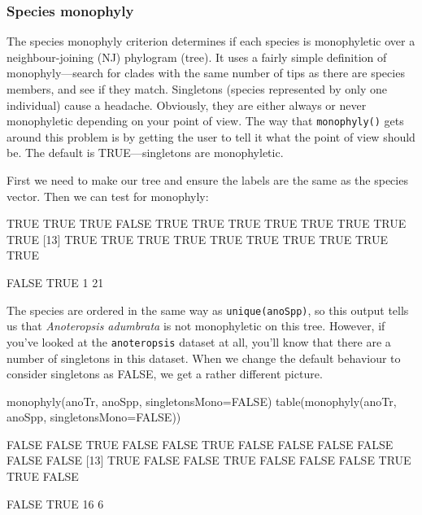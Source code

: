 \documentclass{article}
\newcommand{\scinm}{\emph}
\newcommand{\fun}[1]{\texttt{#1}}
\begin{document}
\subsubsection{Species monophyly}

The species monophyly criterion determines if each species is monophyletic over a neighbour-joining (NJ) phylogram (tree). It uses a fairly simple definition of monophyly---search for clades with the same number of tips as there are species members, and see if they match. Singletons (species represented by only one individual) cause a headache. Obviously, they are either always or never monophyletic depending on your point of view. The way that \fun{monophyly()} gets around this problem is by getting the user to tell it what the point of view should be. The default is TRUE---singletons are monophyletic.

First we need to make our tree and ensure the labels are the same as the species vector. Then we can test for monophyly:


\begin{Routput}
 [1]  TRUE  TRUE  TRUE FALSE  TRUE  TRUE  TRUE  TRUE  TRUE  TRUE  TRUE  TRUE
[13]  TRUE  TRUE  TRUE  TRUE  TRUE  TRUE  TRUE  TRUE  TRUE  TRUE

FALSE  TRUE 
    1    21
\end{Routput}

The species are ordered in the same way as \fun{unique(anoSpp)}, so this output tells us that \scinm{Anoteropsis adumbrata} is not monophyletic on this tree. However, if you've looked at the \fun{anoteropsis} dataset at all, you'll know that there are a number of singletons in this dataset. When we change the default behaviour to consider singletons as FALSE, we get a rather different picture.

\begin{console}
monophyly(anoTr, anoSpp, singletonsMono=FALSE)
table(monophyly(anoTr, anoSpp, singletonsMono=FALSE))
\end{console}

\begin{Routput}
 [1] FALSE FALSE  TRUE FALSE FALSE  TRUE FALSE FALSE FALSE FALSE FALSE FALSE
[13]  TRUE FALSE FALSE  TRUE FALSE FALSE FALSE  TRUE  TRUE FALSE

FALSE  TRUE 
   16     6 
\end{Routput}
\end{document}
